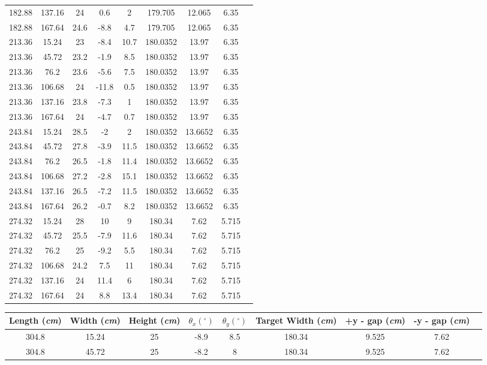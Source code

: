 \begin{landscape}
\begin{center}
\begin{tabular}{| c | c | c | c | c | c | c | c | c |}
182.88 & 137.16 & 24 & 0.6 & 2 & 179.705 & 12.065 & 6.35 \\
182.88 & 167.64 & 24.6 & -8.8 & 4.7 & 179.705 & 12.065 & 6.35 \\
213.36 & 15.24 & 23 & -8.4 & 10.7 & 180.0352 & 13.97 & 6.35 \\
213.36 & 45.72 & 23.2 & -1.9 & 8.5 & 180.0352 & 13.97 & 6.35 \\
213.36 & 76.2 & 23.6 & -5.6 & 7.5 & 180.0352 & 13.97 & 6.35 \\
213.36 & 106.68 & 24 & -11.8 & 0.5 & 180.0352 & 13.97 & 6.35 \\
213.36 & 137.16 & 23.8 & -7.3 & 1 & 180.0352 & 13.97 & 6.35 \\
213.36 & 167.64 & 24 & -4.7 & 0.7 & 180.0352 & 13.97 & 6.35 \\
243.84 & 15.24 & 28.5 & -2 & 2 & 180.0352 & 13.6652 & 6.35 \\
243.84 & 45.72 & 27.8 & -3.9 & 11.5 & 180.0352 & 13.6652 & 6.35 \\
243.84 & 76.2 & 26.5 & -1.8 & 11.4 & 180.0352 & 13.6652 & 6.35 \\
243.84 & 106.68 & 27.2 & -2.8 & 15.1 & 180.0352 & 13.6652 & 6.35 \\
243.84 & 137.16 & 26.5 & -7.2 & 11.5 & 180.0352 & 13.6652 & 6.35 \\
243.84 & 167.64 & 26.2 & -0.7 & 8.2 & 180.0352 & 13.6652 & 6.35 \\
274.32 & 15.24 & 28 & 10 & 9 & 180.34 & 7.62 & 5.715 \\
274.32 & 45.72 & 25.5 & -7.9 & 11.6 & 180.34 & 7.62 & 5.715 \\
274.32 & 76.2 & 25 & -9.2 & 5.5 & 180.34 & 7.62 & 5.715 \\
274.32 & 106.68 & 24.2 & 7.5 & 11 & 180.34 & 7.62 & 5.715 \\
274.32 & 137.16 & 24 & 11.4 & 6 & 180.34 & 7.62 & 5.715 \\
274.32 & 167.64 & 24 & 8.8 & 13.4 & 180.34 & 7.62 & 5.715 \\
\hline
\end{tabular}
\begin{tabular}{| c | c | c | c | c | c | c | c | c |} \hline
Length (\textit{cm}) & Width (\textit{cm}) & Height (\textit{cm}) & $\theta_{x} (^{\circ})$ & $\theta_{y} (^{\circ})$ & Target Width (\textit{cm}) & +y - gap (\textit{cm}) & -y - gap (\textit{cm}) \\
\hline \hline
304.8 & 15.24 & 25 & -8.9 & 8.5 & 180.34 & 9.525 & 7.62 \\
304.8 & 45.72 & 25 & -8.2 & 8 & 180.34 & 9.525 & 7.62 \\

\end{tabular}
\end{center}
\end{landscape}
